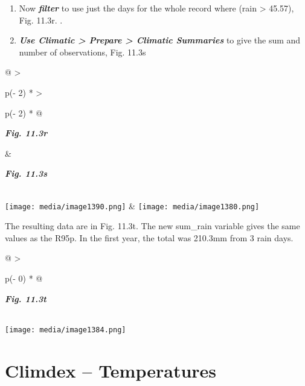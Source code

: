 \documentclass[
  letterpaper,
  DIV=11,
  numbers=noendperiod]{scrreprt}
\begin{document}
\begin{enumerate}
\def\labelenumi{\arabic{enumi}.}
\setcounter{enumi}{2}
\item
  Now \textbf{\emph{filter}} to use just the days for the whole record
  where (rain \textgreater{} 45.57), Fig. 11.3r. .
\item
  \textbf{\emph{Use Climatic \textgreater{} Prepare \textgreater{}
  Climatic Summaries}} to give the sum and number of observations, Fig.
  11.3s
\end{enumerate}

\begin{longtable}[]{@{}
  >{\raggedright\arraybackslash}p{(\columnwidth - 2\tabcolsep) * }
  >{\raggedright\arraybackslash}p{(\columnwidth - 2\tabcolsep) * }@{}}
\toprule\noalign{}
\begin{minipage}[b]{\linewidth}\raggedright
\textbf{\emph{Fig. 11.3r}}
\end{minipage} & \begin{minipage}[b]{\linewidth}\raggedright
\textbf{\emph{Fig. 11.3s}}
\end{minipage} \\
\midrule\noalign{}
\endhead
\bottomrule\noalign{}
\endlastfoot
\texttt{[image: media/image1390.png]}
&
\texttt{[image: media/image1380.png]} \\
\end{longtable}

The resulting data are in Fig. 11.3t. The new sum\_rain variable gives
the same values as the R95p. In the first year, the total was 210.3mm
from 3 rain days.

\begin{longtable}[]{@{}
  >{\raggedright\arraybackslash}p{(\columnwidth - 0\tabcolsep) * }@{}}
\toprule\noalign{}
\begin{minipage}[b]{\linewidth}\raggedright
\textbf{\emph{Fig. 11.3t}}
\end{minipage} \\
\midrule\noalign{}
\endhead
\bottomrule\noalign{}
\endlastfoot
\texttt{[image: media/image1384.png]} \\
\end{longtable}

\section{Climdex -- Temperatures}\label{climdex-temperatures}
\end{document}
